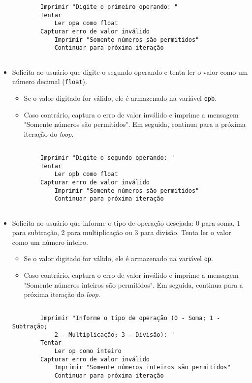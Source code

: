 \documentclass[a4paper, 12pt, onecolumn,singlespacing]{article}
\begin{document}
\begin{itemize}
\begin{verbatim}
		Imprimir "Digite o primeiro operando: "
		Tentar
			Ler opa como float
		Capturar erro de valor inválido
			Imprimir "Somente números são permitidos"
			Continuar para próxima iteração
	
\end{verbatim}
	\item Solicita ao usuário que digite o segundo operando e tenta ler o valor como um número decimal (\texttt{float}).
	\begin{itemize}
		\item Se o valor digitado for válido, ele é armazenado na variável \texttt{opb}.
		\item Caso contrário, captura o erro de valor inválido e imprime a mensagem "Somente números são permitidos". Em seguida, continua para a próxima iteração do \textit{loop}.
	\end{itemize}
\begin{verbatim}
	
		Imprimir "Digite o segundo operando: "
		Tentar
			Ler opb como float
		Capturar erro de valor inválido
			Imprimir "Somente números são permitidos"
			Continuar para próxima iteração
			
\end{verbatim}
	\item Solicita ao usuário que informe o tipo de operação desejada: 0 para soma, 1 para subtração, 2 para multiplicação ou 3 para divisão. Tenta ler o valor como um número inteiro.
	\begin{itemize}
		\item Se o valor digitado for válido, ele é armazenado na variável \texttt{op}.
		\item Caso contrário, captura o erro de valor inválido e imprime a mensagem "Somente números inteiros são permitidos". Em seguida, continua para a próxima iteração do \textit{loop}.
	\end{itemize}
\begin{verbatim}

		Imprimir "Informe o tipo de operação (0 - Soma; 1 - Subtração; 
			2 - Multiplicação; 3 - Divisão): "
		Tentar
			Ler op como inteiro
		Capturar erro de valor inválido
			Imprimir "Somente números inteiros são permitidos"
			Continuar para próxima iteração
		

\end{verbatim}
\end{itemize}
\end{document}

